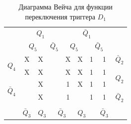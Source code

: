 \documentclass[a4paper,14pt]{article}
\begin{document}

\begin{table}[H]
	\begin{center}
		\caption{\label{tab:D1_tab} Диаграмма Вейча для функции переключения триггера $D_1$ }
		\begin{tabular}{cccccccccc}
			& \multicolumn{4}{c}{$Q_1$} & \multicolumn{4}{c}{$\bar{Q}_1$} &  \\
			& \multicolumn{2}{c}{$Q_5$} & \multicolumn{2}{c}{$\bar{Q}_5$} & \multicolumn{2}{c}{$Q_5$} & \multicolumn{2}{c}{$\bar{Q}_5$} &  \\ \cline{2-9}
			\multicolumn{1}{c|}{\multirow{2}{*}{$Q_4$}} & \multicolumn{1}{c|}{X} & \multicolumn{1}{c|}{X} & \multicolumn{1}{c|}{} & \multicolumn{1}{c|}{} & \multicolumn{1}{c|}{X} & \multicolumn{1}{c|}{X} & \multicolumn{1}{c|}{1} & \multicolumn{1}{c|}{1} & $\bar{Q}_2$ \\ \cline{2-9}
			\multicolumn{1}{c|}{} & \multicolumn{1}{c|}{X} & \multicolumn{1}{c|}{X} & \multicolumn{1}{c|}{} & \multicolumn{1}{c|}{} & \multicolumn{1}{c|}{X} & \multicolumn{1}{c|}{X} & \multicolumn{1}{c|}{1} & \multicolumn{1}{c|}{1} & \multirow{2}{*}{$Q_2$} \\ \cline{2-9}
			\multicolumn{1}{c|}{\multirow{2}{*}{$\bar{Q}_4$}} & \multicolumn{1}{c|}{} & \multicolumn{1}{c|}{X} & \multicolumn{1}{c|}{} & \multicolumn{1}{c|}{} & \multicolumn{1}{c|}{1} & \multicolumn{1}{c|}{X} & \multicolumn{1}{c|}{1} & \multicolumn{1}{c|}{1} &  \\ \cline{2-9}
			\multicolumn{1}{c|}{} & \multicolumn{1}{c|}{} & \multicolumn{1}{c|}{X} & \multicolumn{1}{c|}{} & \multicolumn{1}{c|}{} & \multicolumn{1}{c|}{1} & \multicolumn{1}{c|}{} & \multicolumn{1}{c|}{1} & \multicolumn{1}{c|}{1} & $\bar{Q}_2$ \\ \cline{2-9}
			&  & \multicolumn{2}{c}{} & \multicolumn{2}{c}{} & \multicolumn{2}{c}{} &  &  \\
			\multicolumn{1}{l}{} & \multicolumn{1}{l}{$\bar{Q}_3$} & \multicolumn{2}{l}{$Q_3$} & \multicolumn{2}{l}{$\bar{Q}_3$} & \multicolumn{2}{l}{$Q_3$} & \multicolumn{1}{l}{$\bar{Q}_3$} & \multicolumn{1}{l}{}
		\end{tabular}
	\end{center}
\end{table}

\end{document}
